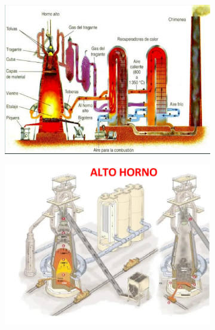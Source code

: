 \documentclass[12pt,a4paper]{article}
\begin{document}
\begin{figure}[h!]
    \centering
    \begin{subfigure}{0.45\textwidth}
        \centering
        \includegraphics[width=\textwidth]{Inagenes para latex/Alto horno.png}
    \end{subfigure}
    \hfill
    \begin{subfigure}{0.45\textwidth}
        \centering
        \includegraphics[width=\textwidth]{Inagenes para latex/alto horno 2.png}
    \end{subfigure}
\end{figure}
\end{document}
